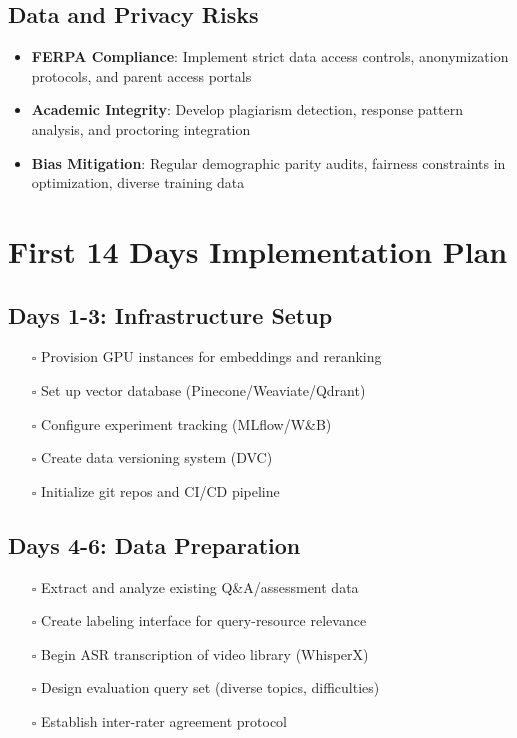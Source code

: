 \documentclass[11pt,a4paper]{report}
\begin{document}
\section{Data and Privacy Risks}

\begin{itemize}
    \item \textbf{FERPA Compliance}: Implement strict data access controls, anonymization protocols, and parent access portals
    \item \textbf{Academic Integrity}: Develop plagiarism detection, response pattern analysis, and proctoring integration
    \item \textbf{Bias Mitigation}: Regular demographic parity audits, fairness constraints in optimization, diverse training data
\end{itemize}

\chapter{First 14 Days Implementation Plan}

\section{Days 1-3: Infrastructure Setup}
\begin{itemize}
    \item[$\square$] Provision GPU instances for embeddings and reranking
    \item[$\square$] Set up vector database (Pinecone/Weaviate/Qdrant)
    \item[$\square$] Configure experiment tracking (MLflow/W\&B)
    \item[$\square$] Create data versioning system (DVC)
    \item[$\square$] Initialize git repos and CI/CD pipeline
\end{itemize}

\section{Days 4-6: Data Preparation}
\begin{itemize}
    \item[$\square$] Extract and analyze existing Q\&A/assessment data
    \item[$\square$] Create labeling interface for query-resource relevance
    \item[$\square$] Begin ASR transcription of video library (WhisperX)
    \item[$\square$] Design evaluation query set (diverse topics, difficulties)
    \item[$\square$] Establish inter-rater agreement protocol
\end{itemize}
\end{document}
